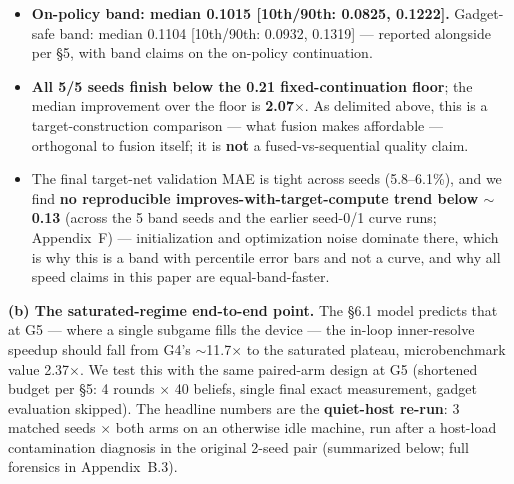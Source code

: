 \documentclass[11pt]{article}
\begin{document}
\begin{itemize}
\item \textbf{On-policy band: median 0.1015 [10th/90th: 0.0825, 0.1222].} Gadget-safe
band: median 0.1104 [10th/90th: 0.0932, 0.1319] --- reported alongside per \S5, with
band claims on the on-policy continuation.
\item \textbf{All 5/5 seeds finish below the 0.21 fixed-continuation floor}; the median
improvement over the floor is \textbf{2.07$\times$}. As delimited above, this is a
target-construction comparison --- what fusion makes affordable --- orthogonal to fusion
itself; it is \textbf{not} a fused-vs-sequential quality claim.
\item The final target-net validation MAE is tight across seeds (5.8--6.1\%), and we find
\textbf{no reproducible improves-with-target-compute trend below $\sim$0.13} (across the
5 band seeds and the earlier seed-0/1 curve runs; Appendix~F) --- initialization and
optimization noise dominate there, which is why this is a band with percentile error
bars and not a curve, and why all speed claims in this paper are equal-band-faster.
\end{itemize}

\textbf{(b) The saturated-regime end-to-end point.} The \S6.1 model predicts that at G5
--- where a single subgame fills the device --- the in-loop inner-resolve speedup should
fall from G4's $\sim$11.7$\times$ to the saturated plateau, microbenchmark value
2.37$\times$. We test this with the same paired-arm design at G5 (shortened budget per
\S5: 4 rounds $\times$ 40 beliefs, single final exact measurement, gadget evaluation
skipped). The headline numbers are the \textbf{quiet-host re-run}: 3 matched seeds
$\times$ both arms on an otherwise idle machine, run after a host-load contamination
diagnosis in the original 2-seed pair (summarized below; full forensics in
Appendix~B.3).
\end{document}
